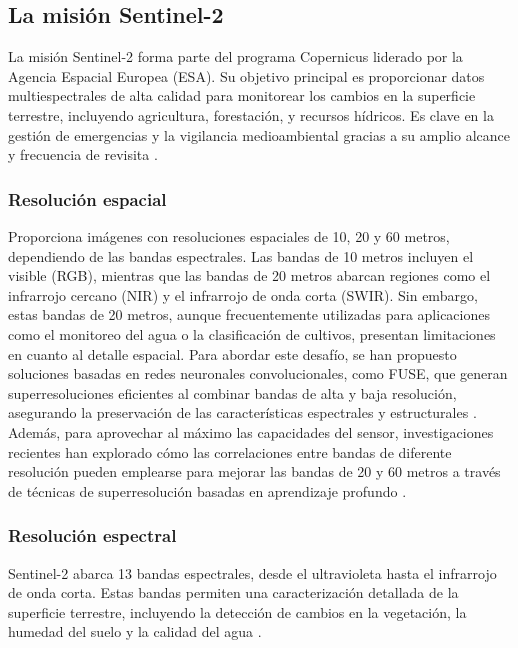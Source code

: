     \subsection{La misión Sentinel-2}

        La misión Sentinel-2 forma parte del programa Copernicus liderado por la Agencia Espacial Europea (ESA). Su objetivo principal es proporcionar datos multiespectrales de alta calidad para monitorear los cambios en la superficie terrestre, incluyendo agricultura, forestación, y recursos hídricos. Es clave en la gestión de emergencias y la vigilancia medioambiental gracias a su amplio alcance y frecuencia de revisita \autocite{wang2016fusion, lanaras2018super}.

        \subsubsection{Resolución espacial}
            Proporciona imágenes con resoluciones espaciales de 10, 20 y 60 metros, dependiendo de las bandas espectrales. Las bandas de 10 metros incluyen el visible (RGB), mientras que las bandas de 20 metros abarcan regiones como el infrarrojo cercano (NIR) y el infrarrojo de onda corta (SWIR). Sin embargo, estas bandas de 20 metros, aunque frecuentemente utilizadas para aplicaciones como el monitoreo del agua o la clasificación de cultivos, presentan limitaciones en cuanto al detalle espacial. Para abordar este desafío, se han propuesto soluciones basadas en redes neuronales convolucionales, como FUSE, que generan superresoluciones eficientes al combinar bandas de alta y baja resolución, asegurando la preservación de las características espectrales y estructurales \autocite{gargiulo2019fast}. Además, para aprovechar al máximo las capacidades del sensor, investigaciones recientes han explorado cómo las correlaciones entre bandas de diferente resolución pueden emplearse para mejorar las bandas de 20 y 60 metros a través de técnicas de superresolución basadas en aprendizaje profundo \autocite{lanaras2018super}.

        \subsubsection{Resolución espectral}
            Sentinel-2 abarca 13 bandas espectrales, desde el ultravioleta hasta el infrarrojo de onda corta. Estas bandas permiten una caracterización detallada de la superficie terrestre, incluyendo la detección de cambios en la vegetación, la humedad del suelo y la calidad del agua \autocite{wang2016fusion}.



